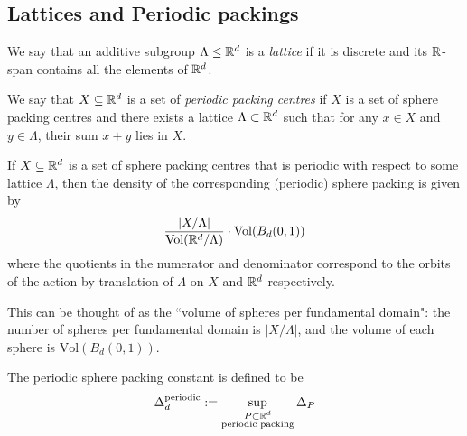 \subsection{Lattices and Periodic packings}

\begin{definition}\label{IsZlattice}\leanok
  We say that an additive subgroup $\Lambda \leq \mathbb{R}^d$ is a \emph{lattice} if it is discrete and its $\mathbb{R}$-span contains all the elements of $\mathbb{R}^d$.
\end{definition}


\begin{definition}\label{SpherePacking.PeriodicPackingCentres}\leanok
  We say that $X \subseteq \mathbb{R}^d$ is a set of \emph{periodic packing centres} if $X$ is a set of sphere packing centres and there exists a lattice $\Lambda \subset \mathbb{R}^d$ such that for any $x \in X$ and $y \in \Lambda$, their sum $x + y$ lies in $X$.
\end{definition}

\begin{lemma}\label{SpherePacking.density of periodic packing}\notready
  If $X \subseteq \mathbb{R}^d$ is a set of sphere packing centres that is periodic with respect to some lattice $\Lambda$, then the density of the corresponding (periodic) sphere packing is given by
  $$ \frac{\lvert {X/\Lambda} \rvert}{\mathrm{Vol}(\mathbb{R}^d / \Lambda)} \cdot \mathrm{Vol}(B_d(0,1))$$
  where the quotients in the numerator and denominator correspond to the orbits of the action by translation of $\Lambda$ on $X$ and $\mathbb{R}^d$ respectively.
\end{lemma}
\begin{remark}
  This can be thought of as the ``volume of spheres per fundamental domain": the number of spheres per fundamental domain is $\lvert {X/\Lambda} \rvert$, and the volume of each sphere is $\mathrm{Vol}(B_d(0,1))$.
\end{remark}

\begin{definition}\label{def-Periodic-sphere-packing-constant}\notready
    The periodic sphere packing constant is defined to be
    $$ \Delta_{d}^{\text{periodic}} := \sup_{\substack{P \subset \mathbb{R}^d \\ \text{periodic packing}}} \Delta_P$$
\end{definition}

